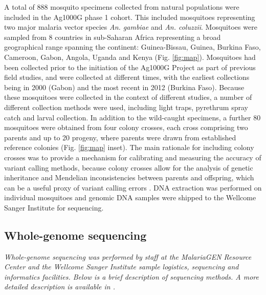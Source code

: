 \documentclass[a4paper,11pt,abstracton,hidelinks]{scrartcl}
\begin{document}
A total of 888 mosquito specimens collected from natural populations were included in the Ag1000G phase 1 cohort.
%
This included mosquitoes representing two major malaria vector species  \textit{An. gambiae} and \textit{An. coluzzii}.
%
Mosquitoes were sampled from 8 countries in sub-Saharan Africa representing a broad geographical range spanning the continent: Guinea-Bissau, Guinea, Burkina Faso, Cameroon, Gabon, Angola, Uganda and Kenya (Fig. \ref{fig:map}).
%
Mosquitoes had been collected prior to the initiation of the Ag1000G Project as part of previous field studies, and were collected at different times, with the earliest collections being in 2000 (Gabon) and the most recent in 2012 (Burkina Faso).
%
Because these mosquitoes were collected in the context of different studies, a number of different collection methods were used, including light traps, pyrethrum spray catch and larval collection.
%
In addition to the wild-caught specimens, a further 80 mosquitoes were obtained from four colony crosses, each cross comprising two parents and up to 20 progeny, where parents were drawn from established reference colonies (Fig. \ref{fig:map} inset).
%
The main rationale for including colony crosses was to provide a mechanism for calibrating and measuring the accuracy of variant calling methods, because colony crosses allow for the analysis of genetic inheritance and Mendelian inconsistencies between parents and offspring, which can be a useful proxy of variant calling errors \citep{Saunders2007,Laurie2010,Pilipenko2014}.
%
DNA extraction was performed on individual mosquitoes and genomic DNA samples were shipped to the Wellcome Sanger Institute for sequencing.


\subsection{Whole-genome sequencing}


\textit{Whole-genome sequencing was performed by staff at the MalariaGEN Resource Center and the Wellcome Sanger Institute sample logistics, sequencing and informatics facilities. Below is a brief description of sequencing methods. A more detailed description is available in \citet{Ag1000G2017}.}
\end{document}

